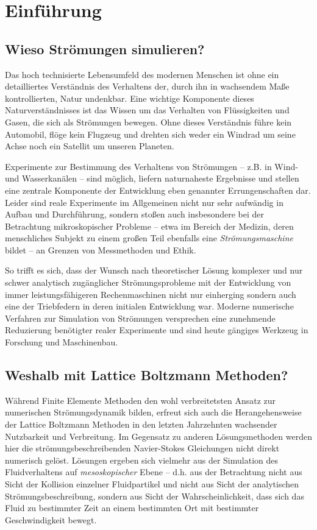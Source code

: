 \section{Einführung}

\subsection{Wieso Strömungen simulieren?}

Das hoch technisierte Lebensumfeld des modernen Menschen ist ohne ein detailliertes Verständnis des Verhaltens der, durch ihn in wachsendem Maße kontrollierten, Natur undenkbar. Eine wichtige Komponente dieses Naturverständnisses ist das Wissen um das Verhalten von Flüssigkeiten und Gasen, die sich als Strömungen bewegen. Ohne dieses Verständnis führe kein Automobil, flöge kein Flugzeug und drehten sich weder ein Windrad um seine Achse noch ein Satellit um unseren Planeten.

Experimente zur Bestimmung des Verhaltens von Strömungen -- z.B. in Wind- und Wasserkanälen -- sind möglich, liefern naturnaheste Ergebnisse und stellen eine zentrale Komponente der Entwicklung eben genannter Errungenschaften dar. Leider sind reale Experimente im Allgemeinen nicht nur sehr aufwändig in Aufbau und Durchführung, sondern stoßen auch insbesondere bei der Betrachtung mikroskopischer Probleme -- etwa im Bereich der Medizin, deren menschliches Subjekt zu einem großen Teil ebenfalls eine \emph{Strömungsmaschine} bildet -- an Grenzen von Messmethoden und Ethik.

So trifft es sich, dass der Wunsch nach theoretischer Lösung komplexer und nur schwer analytisch zugänglicher Strömungsprobleme mit der Entwicklung von immer leistungsfähigeren Rechenmaschinen nicht nur einherging sondern auch eine der Triebfedern in deren initialen Entwicklung war. Moderne numerische Verfahren zur Simulation von Strömungen versprechen eine zunehmende Reduzierung benötigter realer Experimente und sind heute gängiges Werkzeug in Forschung und Maschinenbau.

\subsection{Weshalb mit Lattice Boltzmann Methoden?}

Während Finite Elemente Methoden den wohl verbreitetsten Ansatz zur numerischen Strömungsdynamik bilden, erfreut sich auch die Herangehensweise der Lattice Boltzmann Methoden in den letzten Jahrzehnten wachsender Nutzbarkeit und Verbreitung. Im Gegensatz zu anderen Lösungsmethoden werden hier die strömungsbeschreibenden Navier-Stokes Gleichungen nicht direkt numerisch gelöst. Lösungen ergeben sich vielmehr aus der Simulation des Fluidverhaltens auf \emph{mesoskopischer} Ebene -- d.h. aus der Betrachtung nicht aus Sicht der Kollision einzelner Fluidpartikel und nicht aus Sicht der analytischen Strömungsbeschreibung, sondern aus Sicht der Wahrscheinlichkeit, dass sich das Fluid zu bestimmter Zeit an einem bestimmten Ort mit bestimmter Geschwindigkeit bewegt.

